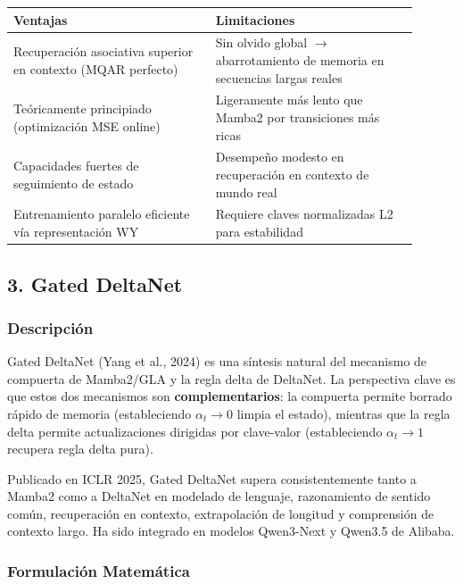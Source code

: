 \documentclass[11pt,a4paper]{article}
\begin{document}
\begin{table}[h]
\centering
\begin{tabular}{|p{0.45\linewidth}|p{0.45\linewidth}|}
\hline
\textbf{Ventajas} & \textbf{Limitaciones} \\
\hline
Recuperación asociativa superior en contexto (MQAR perfecto) & Sin olvido global $\rightarrow$ abarrotamiento de memoria en secuencias largas reales \\
\hline
Teóricamente principiado (optimización MSE online) & Ligeramente más lento que Mamba2 por transiciones más ricas \\
\hline
Capacidades fuertes de seguimiento de estado & Desempeño modesto en recuperación en contexto de mundo real \\
\hline
Entrenamiento paralelo eficiente vía representación WY & Requiere claves normalizadas L2 para estabilidad \\
\hline
\end{tabular}
\end{table}

\subsection{3. Gated DeltaNet}

\subsubsection{Descripción}

Gated DeltaNet (Yang et al., 2024) es una síntesis natural del mecanismo de compuerta de Mamba2/GLA y la regla delta de DeltaNet. La perspectiva clave es que estos dos mecanismos son \textbf{complementarios}: la compuerta permite borrado rápido de memoria (estableciendo $\alpha_t \to 0$ limpia el estado), mientras que la regla delta permite actualizaciones dirigidas por clave-valor (estableciendo $\alpha_t \to 1$ recupera regla delta pura).

Publicado en ICLR 2025, Gated DeltaNet supera consistentemente tanto a Mamba2 como a DeltaNet en modelado de lenguaje, razonamiento de sentido común, recuperación en contexto, extrapolación de longitud y comprensión de contexto largo. Ha sido integrado en modelos Qwen3-Next y Qwen3.5 de Alibaba.

\subsubsection{Formulación Matemática}
\end{document}
